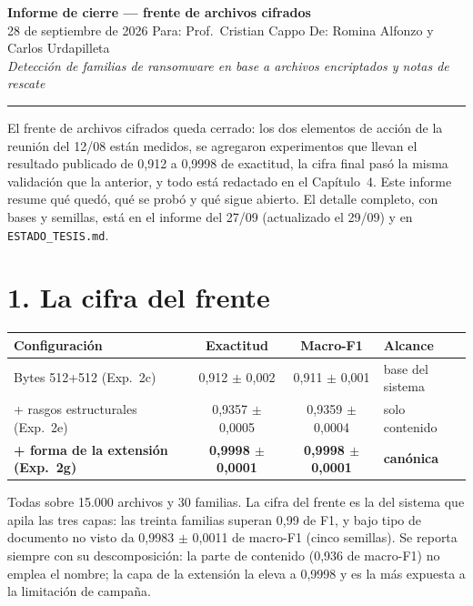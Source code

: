 \documentclass[11pt,a4paper]{article}
\begin{document}
\begin{center}
{\large\bfseries Informe de cierre --- frente de archivos cifrados}\\[6pt]
{\small 28 de septiembre de 2026 \quad\textbullet\quad Para: Prof.\ Cristian Cappo \quad\textbullet\quad
De: Romina Alfonzo y Carlos Urdapilleta}\\[4pt]
{\footnotesize\itshape Detección de familias de ransomware en base a archivos encriptados
y notas de rescate}
\end{center}

\vspace{0.3em}
\hrule
\vspace{0.5em}

El frente de archivos cifrados queda cerrado: los dos elementos de acción de la reunión del
12/08 están medidos, se agregaron experimentos que llevan el resultado publicado de 0,912 a
0,9998 de exactitud, la cifra final pasó la misma validación que la anterior, y todo está
redactado en el Capítulo~4. Este informe resume qué quedó, qué se probó y qué sigue abierto. El
detalle completo, con bases y semillas, está en el informe del 27/09 (actualizado el 29/09) y en
\texttt{ESTADO\_TESIS.md}.

\section*{1. La cifra del frente}

\begin{center}
\small
\begin{tabular}{lccl}
\toprule
\textbf{Configuración} & \textbf{Exactitud} & \textbf{Macro-F1} & \textbf{Alcance} \\
\midrule
Bytes 512+512 (Exp.\ 2c) & 0,912 $\pm$ 0,002 & 0,911 $\pm$ 0,001 & base del sistema \\
+ rasgos estructurales (Exp.\ 2e) & 0,9357 $\pm$ 0,0005 & 0,9359 $\pm$ 0,0004 & solo contenido \\
\textbf{+ forma de la extensión (Exp.\ 2g)} & \textbf{0,9998 $\pm$ 0,0001} & \textbf{0,9998 $\pm$ 0,0001} & \textbf{canónica} \\
\bottomrule
\end{tabular}
\end{center}

Todas sobre 15.000 archivos y 30 familias. La cifra del frente es la del sistema que apila las
tres capas: las treinta familias superan 0,99 de F1, y bajo tipo de documento no visto da 0,9983 $\pm$ 0,0011
de macro-F1 (cinco semillas). Se reporta siempre con su descomposición: la parte de contenido (0,936 de macro-F1) no
emplea el nombre; la capa de la extensión la eleva a 0,9998 y es la más expuesta a la limitación de campaña.
\end{document}
